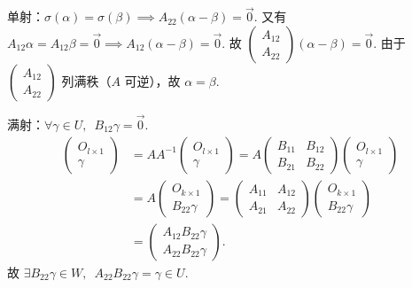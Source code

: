 \begin{exercise}
\begin{exgroup}
\begin{answer}
            单射：$ \sigma(\alpha) = \sigma(\beta) \implies A_{22}(\alpha - \beta) = \vec{0} $. 又有 $ A_{12} \alpha = A_{12} \beta = \vec{0} \implies A_{12}( \alpha - \beta) = \vec{0} $. 故 $ \begin{pmatrix} A_{12} \\ A_{22} \end{pmatrix} (\alpha - \beta) = \vec{0} $. 由于 $ \begin{pmatrix} A_{12} \\ A_{22} \end{pmatrix} $ 列满秩（$ A $ 可逆），故 $ \alpha = \beta $.

            满射：$ \forall \gamma \in U,\enspace B_{12} \gamma = \vec{0} $.
            \begin{align*}
                \begin{pmatrix} O_{l \times 1} \\ \gamma \end{pmatrix}
                & = A A^{-1} \begin{pmatrix} O_{l \times 1} \\ \gamma \end{pmatrix} = A \begin{pmatrix} B_{11} & B_{12} \\ B_{21} & B_{22} \end{pmatrix} \begin{pmatrix} O_{l \times 1} \\ \gamma \end{pmatrix}      \\
                & = A \begin{pmatrix} O_{k \times 1} \\ B_{22} \gamma \end{pmatrix} = \begin{pmatrix} A_{11} & A_{12} \\ A_{21} & A_{22} \end{pmatrix} \begin{pmatrix} O_{k \times 1} \\ B_{22} \gamma \end{pmatrix} \\
                & = \begin{pmatrix} A_{12} B_{22} \gamma \\ A_{22} B_{22} \gamma \end{pmatrix}.
            \end{align*}
            故 $ \exists B_{22} \gamma \in W,\enspace A_{22} B_{22} \gamma = \gamma \in U $.
        \end{answer}


\end{exgroup}
\end{exercise}
